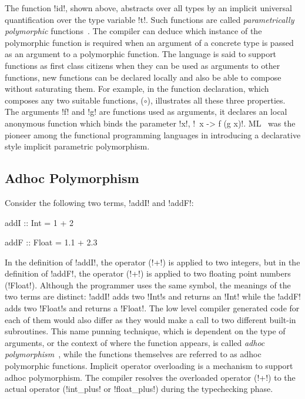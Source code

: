 \documentclass[screen,nonacm,manuscript,review]{acmart} %
\begin{document}
The function !id!, shown above, abstracts over all types by an implicit universal
quantification over the type variable !t!. Such functions are called
\emph{parametrically polymorphic} functions~\cite{strachey_fundamental_2000}.
The compiler can deduce which instance of the polymorphic function is required when
an argument of a concrete type is passed as an argument to a
polymorphic function. The language is said
to support functions as first class citizens when they can be
used as arguments to other functions, new functions can be declared
locally and also be able to compose without saturating them. For
example, in the function declaration, which composes any two suitable
functions, ($\circ$), illustrates all these three properties. The
arguments !f! and !g! are functions used as arguments, it declares an
local anonymous function which binds the parameter !x!, !\ x -> f (g x)!.
ML~\cite{milner_logic_1975,milner_theory_1978}
was the pioneer among the functional programming languages in
introducing a declarative style implicit parametric polymorphism.

\subsection{Adhoc Polymorphism}
Consider the following two terms, !addI! and !addF!:

\begin{minipage}[ht]{0.5\linewidth}
\begin{CenteredBox}
\begin{code}
addI :: Int = 1 + 2
\end{code}
\end{CenteredBox}
\end{minipage}%
\begin{minipage}[ht]{0.5\linewidth}
\begin{CenteredBox}
\begin{code}
addF :: Float = 1.1 + 2.3
\end{code}
\end{CenteredBox}
\end{minipage}

In the definition of !addI!, the operator (!+!) is applied to two
integers, but in the definition of !addF!, the operator (!+!) is
applied to two floating point numbers (!Float!). Although the
programmer uses the same symbol, the meanings of the two terms are
distinct: !addI! adds two !Int!s and returns an !Int! while the !addF!
adds two !Float!s and returns a !Float!. The low level compiler generated code
for each of them would also differ as they would make a call to two
different built-in subroutines. This name punning technique, which is dependent on the
type of arguments, or the context of where the function appears, is called \emph{adhoc
polymorphism}~\cite{strachey_fundamental_2000}, while the functions
themselves are referred to as adhoc polymorphic functions. Implicit
operator overloading is a mechanism to support adhoc polymorphism.
The compiler resolves the overloaded operator (!+!) to
the actual operator (!int_plus! or !float_plus!) during the typechecking phase.
\end{document}
